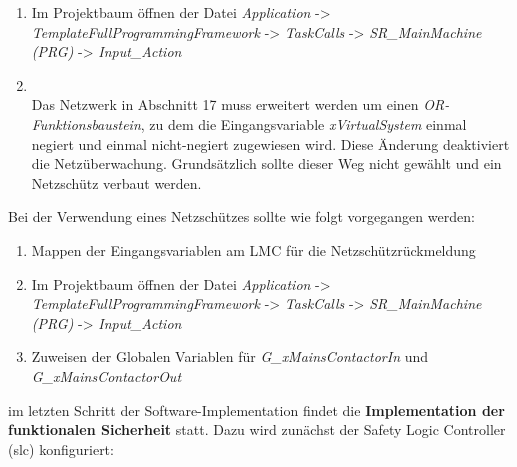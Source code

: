 \documentclass[../../../Bachelorarbeit.tex]{subfiles}
\begin{document}
\begin{enumerate}
    \item Im Projektbaum öffnen der Datei \textit{Application} -> \textit{TemplateFullProgrammingFramework} -> \textit{TaskCalls} -> \textit{SR\_MainMachine (PRG)} -> \textit{Input\_Action}
    \item \begin{minipage}[t]{\linewidth}
        \raggedright
        \label{fig:my-img38}
    \end{minipage}
    \bigskip \\
    Das Netzwerk in Abschnitt 17 muss erweitert werden um einen \textit{OR-Funktionsbaustein}, zu dem die Eingangsvariable \textit{xVirtualSystem} einmal negiert und einmal nicht-negiert zugewiesen wird. Diese Änderung deaktiviert die Netzüberwachung. Grundsätzlich sollte dieser Weg nicht gewählt und ein Netzschütz verbaut werden. 
\end{enumerate}

Bei der Verwendung eines Netzschützes sollte wie folgt vorgegangen werden:

\begin{enumerate}
    \item Mappen der Eingangsvariablen am LMC für die Netzschützrückmeldung
    \item Im Projektbaum öffnen der Datei \textit{Application} -> \textit{TemplateFullProgrammingFramework} -> \textit{TaskCalls} -> \textit{SR\_MainMachine (PRG)} -> \textit{Input\_Action}
    \item Zuweisen der Globalen Variablen für \textit{G\_xMainsContactorIn} und \textit{G\_xMainsContactorOut}
\end{enumerate}

im letzten Schritt der Software-Implementation findet die \textbf{Implementation der funktionalen Sicherheit} statt. Dazu wird zunächst der Safety Logic Controller (\acs{slc}) konfiguriert:
\end{document}
